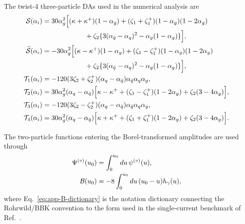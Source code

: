 \documentclass[aps,prd,preprint,nofootinbib,superscriptaddress]{revtex4-2}
\begin{document}
The twist-4 three-particle DAs used in the numerical analysis are
\begin{align}
  {\cal S}(\alpha_i)
  &=
  30\alpha_g^2
  \Big[
  (\kappa+\kappa^+)(1-\alpha_g)
  +(\zeta_1+\zeta_1^+)(1-\alpha_g)(1-2\alpha_g)
  \notag\\
  &\hspace{2.2cm}
  +\zeta_2\{3(\alpha_{\bar q}-\alpha_q)^2-\alpha_g(1-\alpha_g)\}
  \Big],
  \label{eq:app-S}\\
  \widetilde{\cal S}(\alpha_i)
  &=
  -30\alpha_g^2
  \Big[
  (\kappa-\kappa^+)(1-\alpha_g)
  +(\zeta_1-\zeta_1^+)(1-\alpha_g)(1-2\alpha_g)
  \notag\\
  &\hspace{2.2cm}
  +\zeta_2\{3(\alpha_{\bar q}-\alpha_q)^2-\alpha_g(1-\alpha_g)\}
  \Big],
  \label{eq:app-Stilde}\\
  {\cal T}_1(\alpha_i)
  &=
  -120(3\zeta_2+\zeta_2^+)
  (\alpha_q-\alpha_{\bar q})\alpha_{\bar q}\alpha_q\alpha_g,
  \label{eq:app-T1}\\
  {\cal T}_2(\alpha_i)
  &=
  30\alpha_g^2(\alpha_q-\alpha_{\bar q})
  \Big[
  \kappa-\kappa^+
  +(\zeta_1-\zeta_1^+)(1-2\alpha_g)
  +\zeta_2(3-4\alpha_g)
  \Big],
  \label{eq:app-T2}\\
  {\cal T}_3(\alpha_i)
  &=
  -120(3\zeta_2-\zeta_2^+)
  (\alpha_q-\alpha_{\bar q})\alpha_{\bar q}\alpha_q\alpha_g,
  \label{eq:app-T3}\\
  {\cal T}_4(\alpha_i)
  &=
  30\alpha_g^2(\alpha_q-\alpha_{\bar q})
  \Big[
  \kappa+\kappa^+
  +(\zeta_1+\zeta_1^+)(1-2\alpha_g)
  +\zeta_2(3-4\alpha_g)
  \Big].
  \label{eq:app-T4}
\end{align}

The two-particle functions entering the Borel-transformed amplitudes are used
through
\begin{align}
  \Psi^{(v)}(u_0)
  &=
  \int_0^{u_0}du\,\psi^{(v)}(u),
  \label{eq:app-Psiv-int}\\
  {\cal B}(u_0)
  &=
  -8\int_0^{u_0}du\,(u_0-u)h_\gamma(u),
  \label{eq:app-B-dictionary}
\end{align}
where Eq.~\eqref{eq:app-B-dictionary} is the notation dictionary connecting
the Rohrwild/BBK convention to the form used in the single-current benchmark
of Ref.~\cite{Colangelo:2005hv}.
\end{document}
